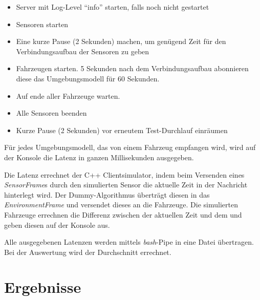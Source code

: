 \begin{itemize}
	\item Server mit Log-Level \enquote{info} starten, falls noch nicht gestartet
	\item Sensoren starten
	\item Eine kurze Pause (2 Sekunden) machen, um genügend Zeit für den Verbindungsaufbau der Sensoren zu geben
	\item Fahrzeugen starten. 5 Sekunden nach dem Verbindungsaufbau abonnieren diese das Umgebungsmodell für 60 Sekunden.
	\item Auf ende aller Fahrzeuge warten.
	\item Alle Sensoren beenden
	\item Kurze Pause (2 Sekunden) vor erneutem Test-Durchlauf einräumen
\end{itemize}

Für jedes Umgebungsmodell, das von einem Fahrzeug empfangen wird, wird auf der Konsole die Latenz in ganzen Millisekunden ausgegeben.

Die Latenz errechnet der C++ Clientsimulator, indem beim Versenden eines \textit{SensorFrame}s durch den simulierten Sensor die aktuelle Zeit in der Nachricht hinterlegt wird.
Der Dummy-Algorithmus überträgt diesen  in das \textit{EnvironmentFrame} und versendet dieses an die Fahrzeuge.
Die simulierten Fahrzeuge errechnen die Differenz zwischen der aktuellen Zeit und dem 
 und geben diesen auf der Konsole aus.
 
Alle ausgegebenen Latenzen werden mittels \textit{bash}-Pipe in eine Datei übertragen.
Bei der Auswertung wird der Durchschnitt errechnet.

\section{Ergebnisse}

